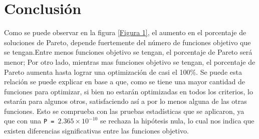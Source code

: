 \documentclass{article}
\begin{document}
\section{Conclusi\'on}
Como se puede observar en la figura \ref{Figura 1}, el aumento en el porcentaje de soluciones de Pareto, depende fuertemente del n\'umero de funciones objetivo que se tengan.\newline Entre menos funciones objetivo se tengan, el porcentaje de Pareto ser\'a menor; Por otro lado, mientras mas funciones objetivo se tengan, el porcentaje de Pareto aumenta hasta lograr una optimizaci\'on de casi el 100\%.
Se puede esta relaci\'on se puede explicar en base a que, como se tiene una mayor cantidad de funciones para optimizar, si bien no estar\'an optimizadas en todos los criterios, lo estar\'an para algunos otros, satisfaciendo as\'i a por lo menos alguna de las otras funciones.\newline
Esto se comprueba con las pruebas estad\'isticas que se aplicaron, ya que con una \texttt{P = $2.365\times 10^{-10}$} se rechaza la hip\'otesis nula, lo cual nos indica que existen diferencias significativas entre las funciones objetivo.



\end{document}
